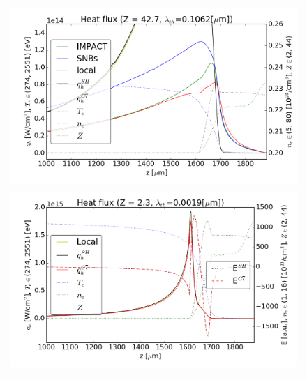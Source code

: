 \documentclass[preprint,12pt]{elsarticle}
\begin{document}
\begin{figure}[tbh]
  \begin{center}
    \begin{tabular}{c}
      \includegraphics[width=1.0\textwidth]{../VFPdata/GD_Hohlraum/fluxes_10ps.png} \\
      \includegraphics[width=1.0\textwidth]{../VFPdata/GD_Hohlraum/diffusion_fluxes_Efield_10ps.png} 
    \end{tabular}
  \caption{
  }
  \end{center}
  \label{fig:Gd_VFP_10ps_heatflux}
\end{figure}
\end{document}
